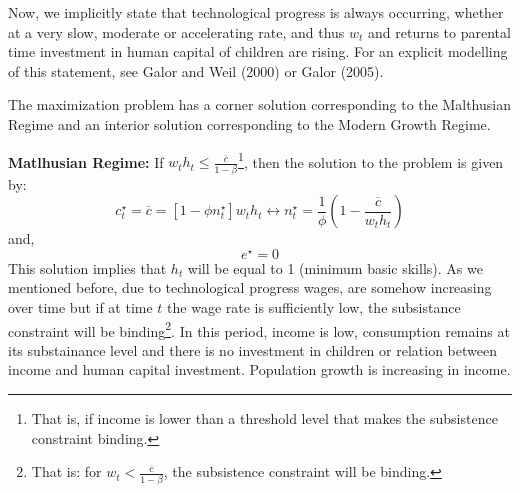 \documentclass[12pt]{article}%
\begin{document}
Now, we implicitly state that technological progress is always occurring, whether at a very slow, moderate or accelerating rate, and thus $w_{t}$ and returns to parental time investment in human capital of children are rising. For an explicit modelling of this statement, see Galor and Weil (2000) or Galor (2005).

The maximization problem has a corner solution corresponding to the Malthusian Regime and an interior solution corresponding to the Modern Growth Regime.

\textbf{Matlhusian Regime:} If $w_{t}h_{t}\leq\frac{\overline{c}}{1-\beta}$\footnote{That is, if income is lower than a threshold level that makes the subsistence constraint binding.}, then the solution to the problem is given by:
\begin{equation}\label{gw14}
c^\star_{t}=\overline{c}=[1-\phi n^\star_{t}]w_{t}h_{t} \longleftrightarrow n^\star_{t}=\frac{1}{\phi}(1-\frac{\overline{c}}{w_{t}h_{t}})
\end{equation}
and,
\begin{equation}\label{gw15}
e^\star=0
\end{equation}
This solution implies that $h_{t}$ will be equal to 1 (minimum basic skills). As we mentioned before, due to technological progress wages, are somehow increasing over time but if at time $t$ the wage rate is sufficiently low, the subsistance constraint will be binding\footnote{That is: for $w_{t} < \frac{\overline{c}}{1-\beta}$, the subsistence constraint will be binding.}. In this period, income is low, consumption remains at its substainance level and there is no investment in children or relation between income and human capital investment. Population growth is increasing in income.
\end{document}
